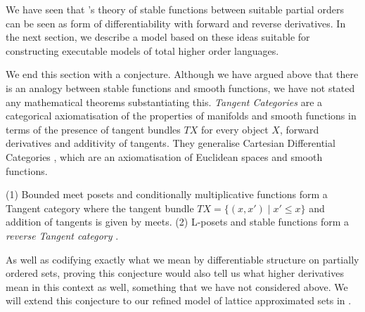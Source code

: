 We have seen that \citet{berry79}'s theory of stable functions between suitable partial orders can be seen as form of differentiability with forward and reverse derivatives. In the next section, we describe a model based on these ideas suitable for constructing executable models of total higher order languages.

We end this section with a conjecture. Although we have argued above
that there is an analogy between stable functions and smooth
functions, we have not stated any mathematical theorems substantiating
this. \emph{Tangent Categories} \cite{rosický84,cockett14,cockett18} are a
categorical axiomatisation of the properties of manifolds and smooth
functions in terms of the presence of tangent bundles $TX$ for every
object $X$, forward derivatives and additivity of tangents. They
generalise Cartesian Differential Categories \cite{cdcs}, which are an
axiomatisation of Euclidean spaces and smooth functions.

\begin{conjecture}
  \label{con:tangent-stable-fns}
  (1) Bounded meet posets and conditionally multiplicative functions
  form a Tangent category where the tangent bundle
  $TX = \{(x,x') \mid x' \leq x\}$ and addition of tangents is given
  by meets. (2) L-posets and stable functions form a \emph{reverse
    Tangent category} \cite{reverse-tangents}.
\end{conjecture}

As well as codifying exactly what we mean by differentiable structure
on partially ordered sets, proving this conjecture would also tell us
what higher derivatives mean in this context as well, something that
we have not considered above. We will extend this conjecture to our
refined model of lattice approximated sets in .


